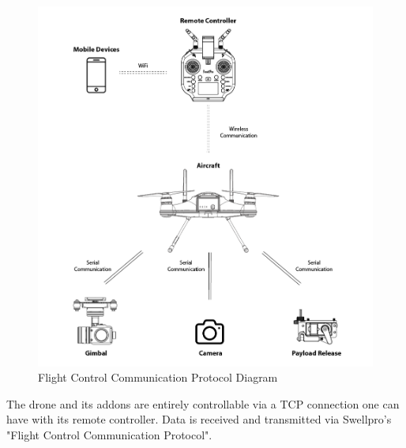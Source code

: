 \begin{figure}[h]
\centering
\includegraphics[scale=1.1]{22_controldiagram.png}
\caption{Flight Control Communication Protocol Diagram \cite{swellpronotion}}
\end{figure}

The drone and its addons are entirely controllable via a TCP connection one can have with its remote controller. Data is received and transmitted via Swellpro's "Flight Control Communication Protocol". \cite{swellpronotion}